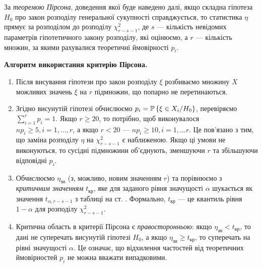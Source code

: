 За \emph{теоремою Пірсона}, доведення якої буде наведено далі, якщо складна гіпотеза $H_0$ про закон розподілу генеральної сукупності 
справджується, то статистика $\eta$ прямує за розподілом до розподілу $\chi^2_{r-s-1}$, де $s$ --- кількість невідомих параметрів гіпотетичного закону розподілу,
які оцінюємо, а $r$ --- кількість множин, за якими рахувалися теоретичні ймовірності $p_i$.

\textbf{Алгоритм використання критерію Пірсона.}
\begin{enumerate}
    \item Після висування гіпотези про закон розподілу $\xi$ розбиваємо множину $X$ можливих значень $\xi$ на $r$ підмножин, що попарно не перетинаються.
    \item Згідно висунутій гіпотезі обчислюємо $p_i = \P\left\{\xi \in X_i / H_0 \right\}$, перевіряємо $\sum\limits_{i=1}^r p_i = 1$.
    Якщо $r\geq 20$, то потрібно, щоб виконувалося $n p_i \geq 5, i = 1, ..., r$, а якщо $r<20$ --- $n p_i \geq 10, i = 1, ... r$. Це пов'язано з тим, що
    заміна розподілу $\eta$ на $\chi^2_{r-s-1}$ є наближеною. Якщо ці умови не виконуються, то сусідні підмножини об'єднують, зменшуючи $r$ та збільшуючи відповідні $p_i$.
    \item Обчислюємо $\eta_{\text{зн}}$ (з, можливо, новим значенням $r$) та порівнюємо з \emph{критичним значенням} $t_{\text{кр}}$, яке для заданого рівня значущості $\alpha$
    шукається як значення $t_{\alpha, r-s-1}$ з таблиці на ст. \pageref{tabel:chi_2}. Формально, $t_{\text{кр}}$ --- це квантиль рівня $1-\alpha$ для розподілу $\chi^2_{r-s-1}$.
    \item Критична область в критерії Пірсона є \emph{правосторонньою}: якщо $\eta_{\text{зн}} < t_{\text{кр}}$, то дані не суперечать висунутій гіпотезі $H_0$, а якщо
    $\eta_{\text{зн}} \geq t_{\text{кр}}$, то суперечать на рівні значущості $\alpha$. Це означає, що відхилення частостей від теоретичних ймовірностей $p_i$ не можна вважати випадковими.
\end{enumerate}

